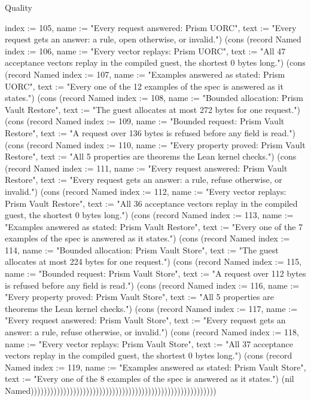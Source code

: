 \begin{lexlean}{Quality}
\begin{semanticmodule}
{{index := 105, name := "Every request answered: Prism UORC", text := "Every request gets an answer: a rule, open otherwise, or invalid."}) (cons (record Named {index := 106, name := "Every vector replays: Prism UORC", text := "All 47 acceptance vectors replay in the compiled guest, the shortest 0 bytes long."}) (cons (record Named {index := 107, name := "Examples answered as stated: Prism UORC", text := "Every one of the 12 examples of the spec is answered as it states."}) (cons (record Named {index := 108, name := "Bounded allocation: Prism Vault Restore", text := "The guest allocates at most 272 bytes for one request."}) (cons (record Named {index := 109, name := "Bounded request: Prism Vault Restore", text := "A request over 136 bytes is refused before any field is read."}) (cons (record Named {index := 110, name := "Every property proved: Prism Vault Restore", text := "All 5 properties are theorems the Lean kernel checks."}) (cons (record Named {index := 111, name := "Every request answered: Prism Vault Restore", text := "Every request gets an answer: a rule, refuse otherwise, or invalid."}) (cons (record Named {index := 112, name := "Every vector replays: Prism Vault Restore", text := "All 36 acceptance vectors replay in the compiled guest, the shortest 0 bytes long."}) (cons (record Named {index := 113, name := "Examples answered as stated: Prism Vault Restore", text := "Every one of the 7 examples of the spec is answered as it states."}) (cons (record Named {index := 114, name := "Bounded allocation: Prism Vault Store", text := "The guest allocates at most 224 bytes for one request."}) (cons (record Named {index := 115, name := "Bounded request: Prism Vault Store", text := "A request over 112 bytes is refused before any field is read."}) (cons (record Named {index := 116, name := "Every property proved: Prism Vault Store", text := "All 5 properties are theorems the Lean kernel checks."}) (cons (record Named {index := 117, name := "Every request answered: Prism Vault Store", text := "Every request gets an answer: a rule, refuse otherwise, or invalid."}) (cons (record Named {index := 118, name := "Every vector replays: Prism Vault Store", text := "All 37 acceptance vectors replay in the compiled guest, the shortest 0 bytes long."}) (cons (record Named {index := 119, name := "Examples answered as stated: Prism Vault Store", text := "Every one of the 8 examples of the spec is answered as it states."}) (nil Named)))))))))))))))))))))))))))))))))))))))))))))))))))))))))
}


\end{semanticmodule}
\end{lexlean}
